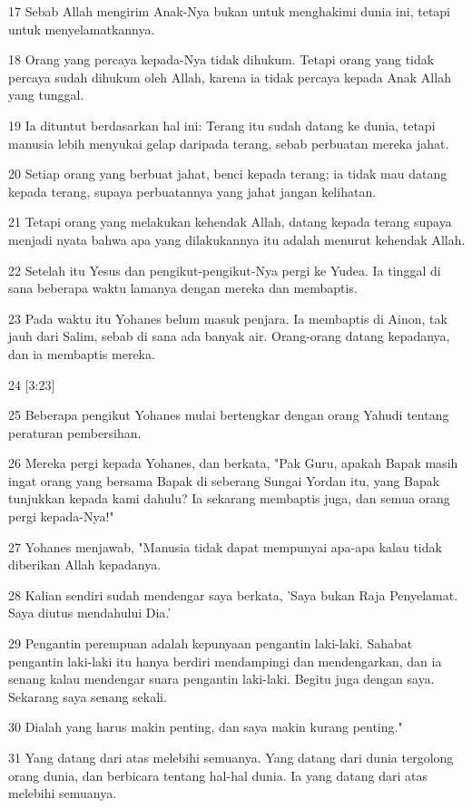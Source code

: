 \par 17 Sebab Allah mengirim Anak-Nya bukan untuk menghakimi dunia ini, tetapi untuk menyelamatkannya.
\par 18 Orang yang percaya kepada-Nya tidak dihukum. Tetapi orang yang tidak percaya sudah dihukum oleh Allah, karena ia tidak percaya kepada Anak Allah yang tunggal.
\par 19 Ia dituntut berdasarkan hal ini: Terang itu sudah datang ke dunia, tetapi manusia lebih menyukai gelap daripada terang, sebab perbuatan mereka jahat.
\par 20 Setiap orang yang berbuat jahat, benci kepada terang; ia tidak mau datang kepada terang, supaya perbuatannya yang jahat jangan kelihatan.
\par 21 Tetapi orang yang melakukan kehendak Allah, datang kepada terang supaya menjadi nyata bahwa apa yang dilakukannya itu adalah menurut kehendak Allah.
\par 22 Setelah itu Yesus dan pengikut-pengikut-Nya pergi ke Yudea. Ia tinggal di sana beberapa waktu lamanya dengan mereka dan membaptis.
\par 23 Pada waktu itu Yohanes belum masuk penjara. Ia membaptis di Ainon, tak jauh dari Salim, sebab di sana ada banyak air. Orang-orang datang kepadanya, dan ia membaptis mereka.
\par 24 [3:23]
\par 25 Beberapa pengikut Yohanes mulai bertengkar dengan orang Yahudi tentang peraturan pembersihan.
\par 26 Mereka pergi kepada Yohanes, dan berkata, "Pak Guru, apakah Bapak masih ingat orang yang bersama Bapak di seberang Sungai Yordan itu, yang Bapak tunjukkan kepada kami dahulu? Ia sekarang membaptis juga, dan semua orang pergi kepada-Nya!"
\par 27 Yohanes menjawab, "Manusia tidak dapat mempunyai apa-apa kalau tidak diberikan Allah kepadanya.
\par 28 Kalian sendiri sudah mendengar saya berkata, 'Saya bukan Raja Penyelamat. Saya diutus mendahului Dia.'
\par 29 Pengantin perempuan adalah kepunyaan pengantin laki-laki. Sahabat pengantin laki-laki itu hanya berdiri mendampingi dan mendengarkan, dan ia senang kalau mendengar suara pengantin laki-laki. Begitu juga dengan saya. Sekarang saya senang sekali.
\par 30 Dialah yang harus makin penting, dan saya makin kurang penting."
\par 31 Yang datang dari atas melebihi semuanya. Yang datang dari dunia tergolong orang dunia, dan berbicara tentang hal-hal dunia. Ia yang datang dari atas melebihi semuanya.
